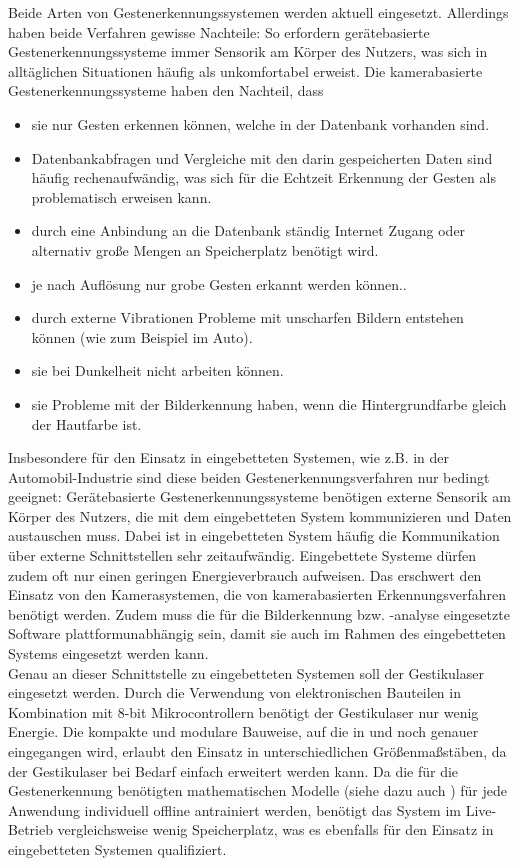 Beide Arten von Gestenerkennungssystemen werden aktuell eingesetzt. Allerdings haben beide Verfahren gewisse Nachteile: So erfordern gerätebasierte Gestenerkennungssysteme immer Sensorik am Körper des Nutzers, was sich in alltäglichen Situationen häufig als unkomfortabel erweist. 
Die kamerabasierte Gestenerkennungssysteme haben den Nachteil, dass
\begin{itemize}
	\item sie nur Gesten erkennen können, welche in der Datenbank vorhanden sind.
	\item Datenbankabfragen und Vergleiche mit den darin gespeicherten Daten sind häufig rechenaufwändig, was sich für die Echtzeit Erkennung der Gesten als problematisch erweisen kann.
	\item durch eine Anbindung an die Datenbank ständig Internet Zugang oder alternativ große Mengen an Speicherplatz benötigt wird. 
	\item je nach Auflösung nur grobe Gesten erkannt werden können..
	\item durch externe Vibrationen Probleme mit unscharfen Bildern entstehen können (wie zum Beispiel im Auto).
	\item sie bei Dunkelheit nicht arbeiten können. 
	\item sie Probleme mit der Bilderkennung haben, wenn die Hintergrundfarbe gleich der Hautfarbe ist. 
\end{itemize}
Insbesondere für den Einsatz in eingebetteten Systemen, wie z.B. in der Automobil-Industrie sind diese beiden Gestenerkennungsverfahren nur bedingt geeignet: Gerätebasierte Gestenerkennungssysteme benötigen externe Sensorik am Körper des Nutzers, die mit dem eingebetteten System kommunizieren und Daten austauschen muss. Dabei ist in eingebetteten System häufig die Kommunikation über externe Schnittstellen sehr zeitaufwändig. Eingebettete Systeme dürfen zudem oft nur einen geringen Energieverbrauch aufweisen. Das erschwert den Einsatz von den Kamerasystemen, die von kamerabasierten Erkennungsverfahren benötigt werden. Zudem muss die für die Bilderkennung bzw. -analyse eingesetzte Software plattformunabhängig sein, damit sie auch im Rahmen des eingebetteten Systems eingesetzt werden kann. \\
Genau an dieser Schnittstelle zu eingebetteten Systemen soll der Gestikulaser eingesetzt werden. Durch die Verwendung von elektronischen Bauteilen in Kombination mit 8-bit Mikrocontrollern benötigt der Gestikulaser nur wenig Energie. Die kompakte und modulare Bauweise, auf die in  und  noch genauer eingegangen wird, erlaubt den Einsatz in unterschiedlichen Größenmaßstäben, da der Gestikulaser bei Bedarf einfach erweitert werden kann. Da die für die Gestenerkennung benötigten mathematischen Modelle (siehe dazu auch ) für jede Anwendung individuell offline antrainiert werden, benötigt das System im Live-Betrieb vergleichsweise wenig Speicherplatz, was es ebenfalls für den Einsatz in eingebetteten Systemen qualifiziert.